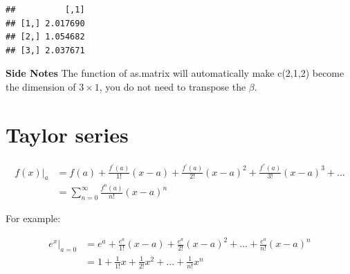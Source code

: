 \documentclass[]{book}
\newenvironment{Shaded}{\begin{snugshade}}{\end{snugshade}}
\newcommand{\KeywordTok}[1]{\textcolor[rgb]{0.13,0.29,0.53}{\textbf{#1}}}
\newcommand{\DataTypeTok}[1]{\textcolor[rgb]{0.13,0.29,0.53}{#1}}
\newcommand{\DecValTok}[1]{\textcolor[rgb]{0.00,0.00,0.81}{#1}}
\newcommand{\CommentTok}[1]{\textcolor[rgb]{0.56,0.35,0.01}{\textit{#1}}}
\newcommand{\OperatorTok}[1]{\textcolor[rgb]{0.81,0.36,0.00}{\textbf{#1}}}
\newcommand{\NormalTok}[1]{#1}
\begin{document}
\begin{Shaded}
\end{Shaded}

\begin{verbatim}
##          [,1]
## [1,] 2.017690
## [2,] 1.054682
## [3,] 2.037671
\end{verbatim}

\textbf{Side Notes} The function of as.matrix will automatically make
c(2,1,2) become the dimension of \(3 \times 1\), you do not need to
transpose the \(\beta\).

\section{Taylor series}\label{taylor-series}

\[\begin{aligned}
f(x)|_{a} &=f(a)+\frac{f^{'}(a)}{1!}(x-a)+\frac{f^{'}(a)}{2!}(x-a)^2+\frac{f^{''}(a)}{3!}(x-a)^{3}+...\\&=\sum_{n=0}^{\infty} \frac{f^{n}(a)}{n!}(x-a)^n 
\end{aligned}\]

For example:

\[\begin{aligned} 
e^x |_{a=0} &= e^a+ \frac{e^a}{1!}(x-a)+\frac{e^a}{2!}(x-a)^2+...+\frac{e^a}{n!}(x-a)^n \\ 
&=  1+ \frac{1}{1!}x+\frac{1}{2!}x^2+...+\frac{1}{n!}x^n
\end{aligned}\]
\end{document}
